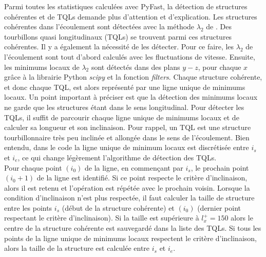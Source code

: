 Parmi toutes les statistiques calculées avec PyFast, la détection de structures cohérentes et de TQLs demande plus d'attention et d'explication. Les structures cohérentes dans l'écoulement sont détectées avec la méthode $\lambda_{2}$ de \citet{Jeong1995}. Des tourbillons quasi longitudinaux (TQLs) se trouvent parmi ces structures cohérentes. Il y a également la nécessité de les détecter. Pour ce faire, les $\lambda_{2}$ de l'écoulement sont tout d'abord calculés avec les fluctuations de vitesse. Ensuite, les minimums locaux de $\lambda_{2}$ sont détectés dans des plans $y-z$, pour chaque $x$ grâce à la librairie Python \textit{scipy} et la fonction \textit{filters}. Chaque structure cohérente, et donc chaque TQL, est alors représenté par une ligne unique de minimums locaux. Un point important à préciser est que la détection des minimums locaux ne garde que les structures étant dans le sens longitudinal. Pour détecter les TQLs, il suffit de parcourir chaque ligne unique de minimums locaux et de calculer sa longueur et son inclinaison. Pour rappel, un TQL est une structure tourbillonnaire très peu inclinée et allongée dans le sens de l'écoulement. Bien entendu, dans le code la ligne unique de minimum locaux est discrétisée entre $i_{s}$ et $i_{e}$, ce qui change légèrement l'algorithme de détection des TQLs.\\

Pour chaque point $(i_{0})$ de la ligne, en commençant par $i_{s}$, le prochain point $(i_{0}+1)$ de la ligne est identifié. Si ce point respecte le critère d'inclinaison, alors il est retenu et l'opération est répétée avec le prochain voisin. Lorsque la condition d'inclinaison n'est plus respectée, il faut calculer la taille de structure entre les points $i_{s}$ (début de la structure cohérente) et $(i_{0})$ (dernier point respectant le critère d'inclinaison). Si la taille est supérieure à $l^{+}_{x}=150$ alors le centre de la structure cohérente est sauvegardé dans la liste des TQLs. Si tous les points de la ligne unique de minimums locaux respectent le critère d'inclinaison, alors la taille de la structure est calculée entre $i_{s}$ et $i_{e}$.\\

